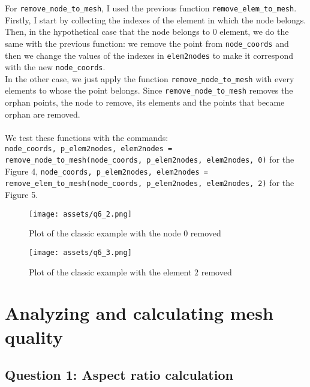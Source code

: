 \documentclass[a4paper]{article}
\begin{document}
For \texttt{remove\_node\_to\_mesh}, I used the previous function \texttt{remove\_elem\_to\_mesh}. Firstly, I start by collecting the indexes of the element in which the node belongs. Then, in the hypothetical case that the node belongs to $0$ element, we do the same with the previous function: we remove the point from \texttt{node\_coords} and then we change the values of the indexes in \texttt{elem2nodes} to make it correspond with the new \texttt{node\_coords}. \\
In the other case, we just apply the function \texttt{remove\_node\_to\_mesh} with every elements to whose the point belongs. Since \texttt{remove\_node\_to\_mesh} removes the orphan points, the node to remove, its elements and the points that became orphan are removed.\\ \\
We test these functions with the commands:\\
\texttt{node\_coords, p\_elem2nodes, elem2nodes = remove\_node\_to\_mesh(node\_coords, p\_elem2nodes, elem2nodes, 0)} for the Figure 4,
\texttt{node\_coords, p\_elem2nodes, elem2nodes = remove\_elem\_to\_mesh(node\_coords, p\_elem2nodes, elem2nodes, 2)} for the Figure 5.
\begin{figure}[H]
    \centering
    \texttt{[image: assets/q6\_2.png]}
    \caption{Plot of the classic example with the node $0$ removed}
    \label{fig:plot_classic_example}
\end{figure}
\begin{figure}[H]
    \centering
    \texttt{[image: assets/q6\_3.png]}
    \caption{Plot of the classic example with the element $2$ removed}
    \label{fig:plot_classic_example}
\end{figure}

\section{Analyzing and calculating mesh quality}

\subsection{Question 1: Aspect ratio calculation}
\end{document}
